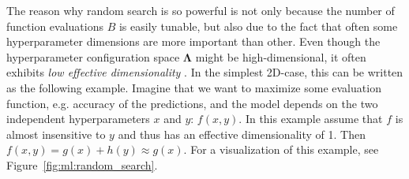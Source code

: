 The reason why random search is so powerful is not only because the number of function evaluations $B$ is easily tunable, but also due to the fact that often some hyperparameter dimensions are more important than other. Even though the hyperparameter configuration space $\bm{\Lambda}$  might be high-dimensional, it often exhibits \emph{low effective dimensionality} \autocite{bergstraRandomSearchHyperparameter2012}. In the simplest 2D-case, this can be written as the following example. Imagine that we want to maximize some evaluation function, e.g. accuracy of the predictions, and the model depends on the two independent hyperparameters $x$ and $y$: $f(x, y)$. In this example assume that $f$ is almost insensitive to $y$ and thus has an effective dimensionality of 1. Then $f(x,y) = g(x) + h(y) \approx g(x)$. For a visualization of this example, see Figure~\ref{fig:ml:random_search}.

